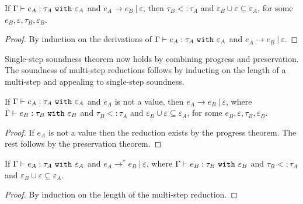 \begin{theorem}
If $\Gamma \vdash e_A: \tau_A~\mathtt{with}~ \varepsilon_A$ and $e_A \longrightarrow e_B~|~\varepsilon$, then $\tau_B <: \tau_A$ and $\varepsilon_B \cup \varepsilon \subseteq \varepsilon_A$, for some $e_B, \varepsilon, \tau_B, \varepsilon_B$.
\end{theorem}

\begin{proof}  By induction on the derivations of $\Gamma \vdash e_A: \tau_A~\mathtt{with}~ \varepsilon_A$ and $e_A \longrightarrow e_B~|~\varepsilon$.
\end{proof}

Single-step soundness theorem now holds by combining progress and preservation. The soundness of multi-step reductions follows by inducting on the length of a multi-step and appealing to single-step soundness.

\begin{theorem}
If $ \Gamma \vdash  e_A:  \tau_A~\mathtt{with}~ \varepsilon_A$ and $ e_A$ is not a value, then $e_A \longrightarrow e_B~|~\varepsilon$, where $ \Gamma \vdash e_B:  \tau_B~\mathtt{with}~ \varepsilon_B$ and $ \tau_B <:  \tau_A$ and $\varepsilon_B \cup \varepsilon \subseteq \varepsilon_A$, for some $e_B, \varepsilon, \tau_B, \varepsilon_B$.
\end{theorem}
\begin{proof}
If $ e_A$ is not a value then the reduction exists by the progress theorem. The rest follows by the preservation theorem.
\end{proof}

\begin{theorem}
If $ \Gamma \vdash  e_A:  \tau_A~\mathtt{with}~ \varepsilon_A$ and $e_A \longrightarrow^{*} e_B~|~\varepsilon$, where $\Gamma \vdash e_B: \tau_B~\mathtt{with}~ \varepsilon_B$ and $ \tau_B <: \tau_A$ and $\varepsilon_B \cup \varepsilon \subseteq \varepsilon_A$.
\end{theorem}

\begin{proof} By induction on the length of the multi-step reduction.
\end{proof}